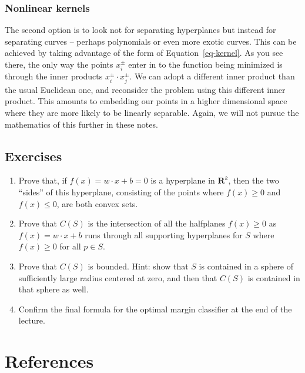 \documentclass[
  11pt,
  letterpaper,
]{scrbook}
\theoremstyle{plain}
\theoremstyle{plain}
\theoremstyle{remark}
\begin{document}
\hypertarget{nonlinear-kernels}{%
\subsection{Nonlinear kernels}\label{nonlinear-kernels}}

The second option is to look not for separating hyperplanes but instead
for separating curves -- perhaps polynomials or even more exotic curves.
This can be achieved by taking advantage of the form of
Equation~\ref{eq-kernel}. As you see there, the only way the points
\(x_{i}^{\pm}\) enter in to the function being minimized is through the
inner products \(x_{i}^{\pm}\cdot x_{j}^{\pm}\). We can adopt a
different inner product than the usual Euclidean one, and reconsider the
problem using this different inner product. This amounts to embedding
our points in a higher dimensional space where they are more likely to
be linearly separable. Again, we will not pursue the mathematics of this
further in these notes.

\hypertarget{sec-exercises}{%
\section{Exercises}\label{sec-exercises}}

\begin{enumerate}
\def\labelenumi{\arabic{enumi}.}
\item
  Prove that, if \(f(x)=w\cdot x+b=0\) is a hyperplane in
  \(\mathbf{R}^{k}\), then the two ``sides'' of this hyperplane,
  consisting of the points where \(f(x)\ge 0\) and \(f(x)\le 0\), are
  both convex sets.
\item
  Prove that \(C(S)\) is the intersection of all the halfplanes
  \(f(x)\ge 0\) as \(f(x)=w\cdot x+b\) runs through all supporting
  hyperplanes for \(S\) where \(f(x)\ge 0\) for all \(p\in S\).
\item
  Prove that \(C(S)\) is bounded. Hint: show that \(S\) is contained in
  a sphere of sufficiently large radius centered at zero, and then that
  \(C(S)\) is contained in that sphere as well.
\item
  Confirm the final formula for the optimal margin classifier at the end
  of the lecture.
\end{enumerate}


\hypertarget{references}{%
\chapter*{References}\label{references}}
\end{document}
